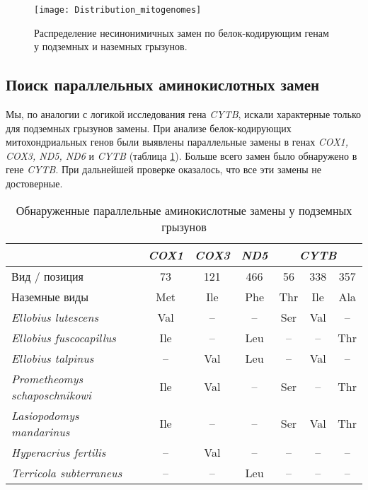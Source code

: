 \begin{figure}[h!]
	\begin{center}
		\texttt{[image: Distribution\_mitogenomes]}
	\end{center}
	\caption{Распределение несинонимичных замен по белок-кодирующим генам у подземных и наземных грызунов.}\label{manhattan_NS}
\end{figure}


\subsection{Поиск параллельных аминокислотных замен}

Мы, по аналогии с логикой исследования гена \textit{CYTB}, искали характерные только для подземных грызунов замены. При анализе белок-кодирующих митохондриальных генов были выявлены параллельные замены в генах \textit{COX1, COX3, ND5, ND6} и \textit{CYTB} (таблица \ref{Underground_subs}). Больше всего замен было обнаружено в гене \textit{CYTB}. При дальнейшей проверке оказалось, что все эти замены не достоверные.

\begin{table}[h!]
	\caption{Обнаруженные параллельные аминокислотные замены у подземных грызунов}\label{Underground_subs}
	\vspace{5mm}
\begin{tabular}{|l|c|c|c|c|c|c|}
	\hline
	& \textit{COX1} & \textit{COX3} & \textit{ND5} & \multicolumn{3}{c|}{\textit{CYTB}} \\ \hline
	Вид   / позиция              & 73   & 121  & 466 & 56      & 338    & 357    \\ \hline
	Наземные виды                & Met  & Ile  & Phe & Thr     & Ile    & Ala    \\ \hline
	\textit{Ellobius lutescens}          & Val  & --   & --  & Ser     & Val    & --     \\ \hline
	\textit{Ellobius fuscocapillus}       & Ile  & --   & Leu & --      & --     & Thr    \\ \hline
	\textit{Ellobius talpinus}            & --   & Val  & Leu & --      & Val    & --     \\ \hline
	\textit{Prometheomys schaposchnikowi} & Ile  & Val  & --  & Ser     & --     & Thr    \\ \hline
	\textit{Lasiopodomys mandarinus}      & Ile  & --   & --  & Ser     & Val    & Thr    \\ \hline
	\textit{Hyperacrius fertilis}         & --   & Val  & --  & --      & --     & --     \\ \hline
	\textit{Terricola subterraneus}       & --   & --   & Leu & --      & --     & --     \\ \hline
\end{tabular}	
\end{table}


